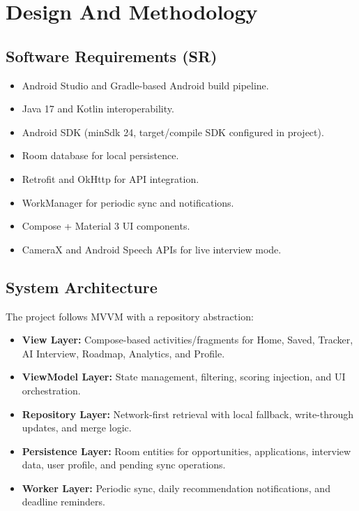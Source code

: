 \documentclass[conference]{IEEEtran}
\begin{document}
\section{Design And Methodology}

\subsection{Software Requirements (SR)}

\begin{itemize}
  \item Android Studio and Gradle-based Android build pipeline.
  \item Java 17 and Kotlin interoperability.
  \item Android SDK (minSdk 24, target/compile SDK configured in project).
  \item Room database for local persistence.
  \item Retrofit and OkHttp for API integration.
  \item WorkManager for periodic sync and notifications.
  \item Compose + Material 3 UI components.
  \item CameraX and Android Speech APIs for live interview mode.
\end{itemize}

\subsection{System Architecture}

The project follows MVVM with a repository abstraction:

\begin{itemize}
  \item \textbf{View Layer:} Compose-based activities/fragments for Home, Saved, Tracker, AI Interview, Roadmap, Analytics, and Profile.
  \item \textbf{ViewModel Layer:} State management, filtering, scoring injection, and UI orchestration.
  \item \textbf{Repository Layer:} Network-first retrieval with local fallback, write-through updates, and merge logic.
  \item \textbf{Persistence Layer:} Room entities for opportunities, applications, interview data, user profile, and pending sync operations.
  \item \textbf{Worker Layer:} Periodic sync, daily recommendation notifications, and deadline reminders.
\end{itemize}
\end{document}
